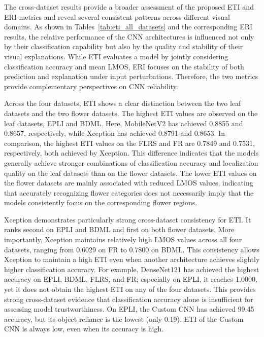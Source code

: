 \documentclass[a4paper,fleqn]{cas-dc}
\begin{document}
The cross-dataset results provide a broader assessment of the proposed ETI and ERI metrics and reveal several consistent patterns across different visual domains. As shown in Tables~\ref{tab:eti_all_datasets} and the corresponding ERI results, the relative performance of the CNN architectures is influenced not only by their classification capability but also by the quality and stability of their visual explanations. While ETI evaluates a model by jointly considering classification accuracy and mean LMOS, ERI focuses on the stability of both prediction and explanation under input perturbations. Therefore, the two metrics provide complementary perspectives on CNN reliability.

Across the four datasets, ETI shows a clear distinction between the two leaf datasets and the two flower datasets. The highest ETI values are observed on the leaf datasets, EPLI and BDML. Here, MobileNetV2 has achieved 0.8855 and 0.8657, respectively, while Xception has achieved 0.8791 and 0.8653. In comparison, the highest ETI values on the FLRS and FR are 0.7849 and 0.7531, respectively, both achieved by Xception. This difference indicates that the models generally achieve stronger combinations of classification accuracy and localization quality on the leaf datasets than on the flower datasets. The lower ETI values on the flower datasets are mainly associated with reduced LMOS values, indicating that accurately recognizing flower categories does not necessarily imply that the models consistently focus on the corresponding flower regions.

Xception demonstrates particularly strong cross-dataset consistency for ETI. It ranks second on EPLI and BDML and first on both flower datasets. More importantly, Xception maintains relatively high LMOS values across all four datasets, ranging from 0.6029 on FR to 0.7800 on BDML. This consistency allows Xception to maintain a high ETI even when another architecture achieves slightly higher classification accuracy. For example, DenseNet121 has achieved the highest accuracy on EPLI, BDML, FLRS, and FR; especially on EPLI, it reaches 1.0000, yet it does not obtain the highest ETI on any of the four datasets. This provides strong cross-dataset evidence that classification accuracy alone is insufficient for assessing model trustworthiness. On EPLI, the Custom CNN has achieved 99.45 accuracy, but its object reliance is the lowest (only 0.19). ETI of the Custom CNN is always low, even when its accuracy is high. 
\end{document}
